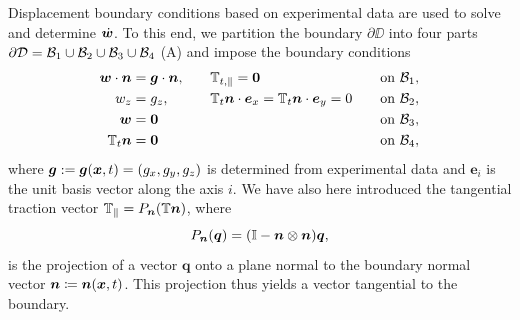 \documentclass{template}
\begin{document}
Displacement boundary conditions based on experimental
data are used to solve  
and determine $\dot{\bm{w}}$. To this end, we partition the boundary 
$\partial\DD$ into four parts
$\partial\mathcal{D}=\mathcal{B}_1\cup\mathcal{B}_2\cup\mathcal{B}_3\cup\mathcal{B}_4$ (A)
and impose the boundary conditions
\begin{alignat}{3}
    \bm{w}\cdot\bm{n}  &= \bm{g}\cdot\bm{n}, &&\quad\mathbb{T}_{t, \parallel} = \bm{0} &&\quad\text{on }\mathcal{B}_1, \label{eq:experimental_normal_displacement_bc}\\
    w_z  &= g_z, &&\quad\mathbb{T}_t\bm{n}\cdot \bm{e}_x = \mathbb{T}_t\bm{n}\cdot \bm{e}_y = 0 &&\quad\text{on }\mathcal{B}_2, \label{eq:experimental_z_displacement_bc}\\
    \bm{w}  &= \bm{0} && &&\quad\text{on }\mathcal{B}_3, \label{eq:anchored_displacement_bc}\\
    \mathbb{T}_t\bm{n} &= \bm{0} && &&\quad\text{on }\mathcal{B}_4, \label{eq:traction_free_displacement_bc}
\end{alignat}
where $\bm{g} := \bm{g}(\bm{x}, t) = (g_x, g_y, g_z)$ is determined from experimental
data and $\bm{e}_i$ is the unit basis vector along the axis $i$.
We have also here introduced the tangential traction vector
$\mathbb{T}_{\parallel} = P_{\bm{n}}(\mathbb{T}\bm{n})$, where
 $$P_{\bm{n}}(\bm{q}) = (\mathbb{I} - \bm{n}\otimes\bm{n})\bm{q},$$
is the projection of a vector $\bm{q}$ onto a plane normal
to the boundary normal vector $\bm{n}\coloneqq\bm{n}(\bm{x}, t)$.
This projection thus yields a vector tangential to the boundary.
\end{document}

